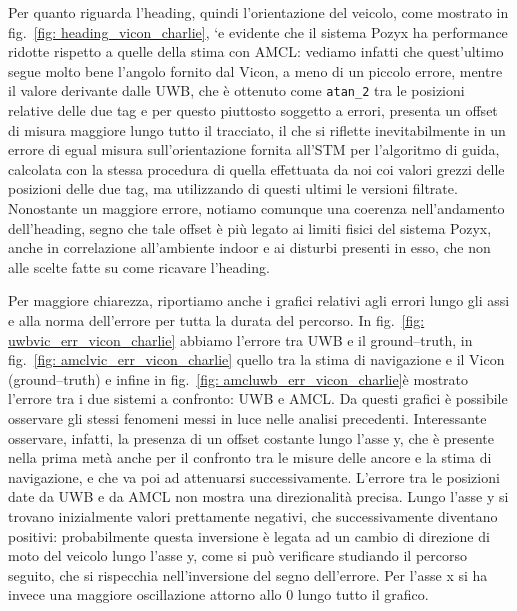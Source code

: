 \vspace{0.5cm}
Per quanto riguarda l'heading, quindi l'orientazione del veicolo, come mostrato in fig.~\ref{fig: heading_vicon_charlie}, `e evidente che il sistema Pozyx ha performance ridotte rispetto a quelle della stima con AMCL: vediamo infatti che quest'ultimo segue molto bene l'angolo fornito dal Vicon, a meno di un piccolo errore, mentre il valore derivante dalle UWB, che è ottenuto come \verb|atan_2| tra le posizioni relative delle due tag e per questo piuttosto soggetto a errori, presenta un offset di misura maggiore lungo tutto il tracciato, il che si riflette inevitabilmente in un errore di egual misura sull'orientazione fornita all'STM per l'algoritmo di guida, calcolata con la stessa procedura di quella effettuata da noi coi valori grezzi delle posizioni delle due tag, ma utilizzando di questi ultimi le versioni filtrate. Nonostante un maggiore errore, notiamo comunque una coerenza nell'andamento dell'heading, segno che tale offset è più legato ai limiti fisici del sistema Pozyx, anche in correlazione all'ambiente indoor e ai disturbi presenti in esso, che non alle scelte fatte su come ricavare l'heading.

\vspace{0.5cm}
Per maggiore chiarezza, riportiamo anche i grafici relativi agli errori lungo gli assi e alla norma dell'errore per tutta la durata del percorso. In fig.~\ref{fig: uwbvic_err_vicon_charlie} abbiamo l'errore tra UWB e il ground--truth, in fig.~\ref{fig: amclvic_err_vicon_charlie} quello tra la stima di navigazione e il Vicon (ground--truth) e infine in fig.~\ref{fig: amcluwb_err_vicon_charlie}è mostrato l'errore tra i due sistemi a confronto: UWB e AMCL. Da questi grafici è possibile osservare gli stessi fenomeni messi in luce nelle analisi precedenti. Interessante osservare, infatti, la presenza di un offset costante lungo l'asse y, che è presente nella prima metà anche per il confronto tra le misure delle ancore e la stima di navigazione, e che va poi ad attenuarsi successivamente. L'errore tra le posizioni date da UWB e da AMCL non mostra una direzionalità precisa. Lungo l'asse y si trovano inizialmente valori prettamente negativi, che successivamente diventano positivi: probabilmente questa inversione è legata ad un cambio di direzione di moto del veicolo lungo l'asse y, come si può verificare studiando il percorso seguito, che si rispecchia nell'inversione del segno dell'errore. Per l'asse x si ha invece una maggiore oscillazione attorno allo 0 lungo tutto il grafico.

